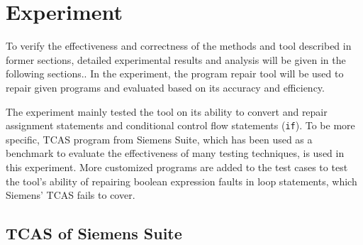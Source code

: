 \documentclass[10pt,journal,final,]{article}
\theoremstyle{definition}
\begin{document}
\newpage
\section{Experiment}
To verify the effectiveness and correctness of the methods and tool described in former sections, detailed experimental results and analysis will be given in the following sections..
In the experiment, the program repair tool will be used to repair given programs and evaluated based on its accuracy and efficiency.

The experiment mainly tested the tool on its ability to convert and repair assignment statements and conditional control flow statements (\lstinline|if|).
To be more specific, TCAS program from Siemens Suite, which has been used as a benchmark to evaluate the effectiveness of many testing techniques, is used in this experiment.
More customized programs are added to the test cases to test the tool's ability of repairing boolean expression faults in loop statements, which Siemens' TCAS fails to cover.

\subsection{TCAS of Siemens Suite}
\end{document}
